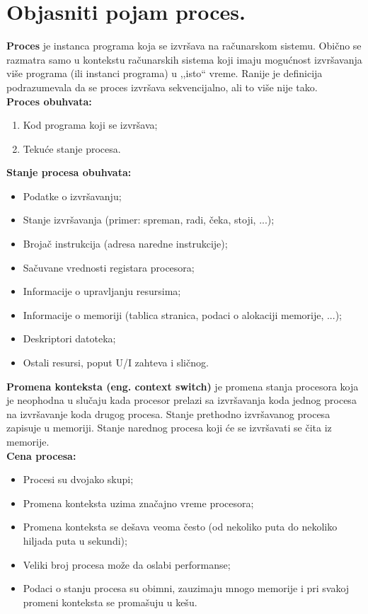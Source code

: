 \documentclass[a4paper]{article}
\begin{document}
\section{Objasniti pojam proces.}
  \textbf{Proces} je instanca programa koja se izvršava na računarskom sistemu. 
  Obično se razmatra samo u kontekstu računarskih sistema koji imaju mogućnost 
  izvršavanja više programa (ili instanci programa) u ,,isto`` vreme. Ranije je definicija 
  podrazumevala da se proces izvršava sekvencijalno, ali to više nije tako.\\
  \textbf{Proces obuhvata:}
  \begin{enumerate}
    \item Kod programa koji se izvršava;
    \item Tekuće stanje procesa.
  \end{enumerate}
  \textbf{Stanje procesa obuhvata:}
  \begin{itemize}
    \item Podatke o izvršavanju;
    \item Stanje izvršavanja (primer: spreman, radi, čeka, stoji, ...);
    \item Brojač instrukcija (adresa naredne instrukcije);
    \item Sačuvane vrednosti registara procesora;
    \item Informacije o upravljanju resursima;
    \item Informacije o memoriji (tablica stranica, podaci o alokaciji memorije, ...);
    \item Deskriptori datoteka;
    \item Ostali resursi, poput U/I zahteva i sličnog.
  \end{itemize}
  
  \textbf{Promena konteksta (eng. context switch)} je promena stanja procesora koja je 
  neophodna u slučaju kada procesor prelazi sa izvršavanja koda jednog procesa  
  na izvršavanje koda drugog procesa. Stanje prethodno izvršavanog procesa zapisuje u memoriji. 
  Stanje narednog procesa koji će se izvršavati se čita iz memorije.\\
  \textbf{Cena procesa:}
  \begin{itemize}
    \item Procesi su dvojako skupi;
    \item Promena konteksta uzima značajno vreme procesora;
    \item Promena konteksta se dešava veoma često (od nekoliko puta do nekoliko hiljada 
          puta u sekundi);
    \item Veliki broj procesa može da oslabi performanse;
    \item Podaci o stanju procesa su obimni, zauzimaju mnogo memorije i pri svakoj promeni konteksta 
          se promašuju u kešu.
  \end{itemize}
\end{document}
